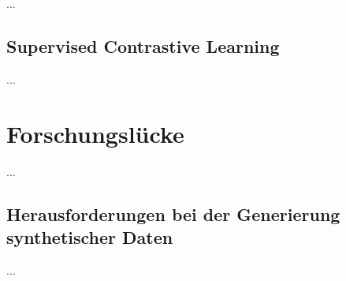 ...

\subsection{Supervised Contrastive Learning}


...

\section{Forschungslücke}

...

\subsection{Herausforderungen bei der Generierung synthetischer Daten}

...

